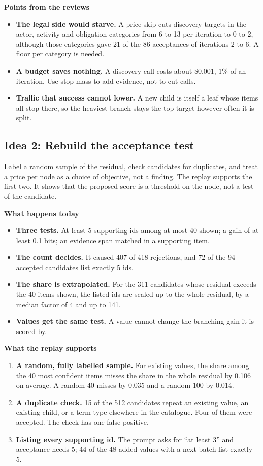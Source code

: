 \documentclass[10pt,a4paper]{article}
\newcommand{\lab}[1]{\par\vspace{0.35em}\textbf{#1}\par\nobreak}
\begin{document}
\lab{Points from the reviews}
\begin{itemize}
\item \textbf{The legal side would starve.} A price skip cuts discovery targets in the actor, activity and obligation categories from 6 to 13 per iteration to 0 to 2, although those categories gave 21 of the 86 acceptances of iterations 2 to 6. A floor per category is needed.
\item \textbf{A budget saves nothing.} A discovery call costs about \$0.001, 1\% of an iteration. Use stop mass to add evidence, not to cut calls.
\item \textbf{Traffic that success cannot lower.} A new child is itself a leaf whose items all stop there, so the heaviest branch stays the top target however often it is split.
\end{itemize}

\subsection{Idea 2: Rebuild the acceptance test}

Label a random sample of the residual, check candidates for duplicates, and treat a price per node as a
choice of objective, not a finding. The replay supports the first two. It shows that the proposed score is a
threshold on the node, not a test of the candidate.

\lab{What happens today}
\begin{itemize}
\item \textbf{Three tests.} At least 5 supporting ids among at most 40 shown; a gain of at least 0.1 bits; an evidence span matched in a supporting item.
\item \textbf{The count decides.} It caused 407 of 418 rejections, and 72 of the 94 accepted candidates list exactly 5 ids.
\item \textbf{The share is extrapolated.} For the 311 candidates whose residual exceeds the 40 items shown, the listed ids are scaled up to the whole residual, by a median factor of 4 and up to 141.
\item \textbf{Values get the same test.} A value cannot change the branching gain it is scored by.
\end{itemize}

\lab{What the replay supports}
\begin{enumerate}
\item \textbf{A random, fully labelled sample.} For existing values, the share among the 40 most confident items misses the share in the whole residual by 0.106 on average. A random 40 misses by 0.035 and a random 100 by 0.014.
\item \textbf{A duplicate check.} 15 of the 512 candidates repeat an existing value, an existing child, or a term type elsewhere in the catalogue. Four of them were accepted. The check has one false positive.
\item \textbf{Listing every supporting id.} The prompt asks for ``at least 3'' and acceptance needs 5; 44 of the 48 added values with a next batch list exactly 5.
\end{enumerate}
\end{document}
